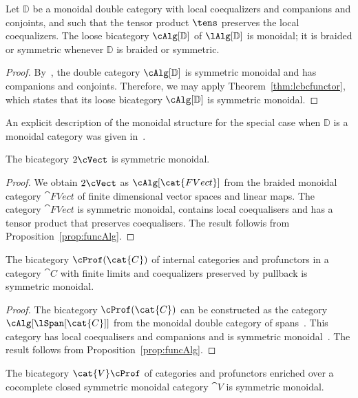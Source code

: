 \begin{prop}\label{thm:eqcomp}
Let $\mathbb{D}$ be a monoidal double category with local coequalizers and companions and conjoints, and such that the tensor product $\tens$ preserves the local coequalizers. The loose bicategory $\cAlg[\mathbb{D}]$ of $\lAlg[\mathbb{D}]$ is monoidal; it is braided or symmetric whenever $\mathbb{D}$ is braided or symmetric.
\end{prop}

\begin{proof}
By~\cite[Examples 9.2]{shulman:frbi}, the double category $\cAlg[\mathbb{D}]$ is symmetric monoidal and has companions and conjoints. Therefore, we may apply Theorem~\ref{thm:lcbcfunctor}, which states that its loose bicategory $\cAlg[\mathbb{D}]$ is symmetric monoidal.
\end{proof}


An explicit description of the monoidal structure for the special case when ${\mathbb{D}}$ is a monoidal category was given in~\cite{westerPhDthesis}. 

\begin{cor}
The bicategory $2\cVect$ is symmetric monoidal.
\end{cor}

\begin{proof}
We obtain $2\cVect$ as $\cAlg[\cat{FVect}]$ from the braided monoidal category $\cat{FVect}$ of finite dimensional vector spaces and linear maps. The category $\cat{FVect}$ is symmetric monoidal, contains local coequalisers and has a tensor product that preserves coequalisers. The result followis from Proposition~\ref{prop:funcAlg}.
\end{proof}

\begin{cor}
The bicategory $\cProf(\cat{C})$ of internal categories and profunctors in a category $\cat{C}$ with finite limits and coequalizers preserved by pullback is symmetric monoidal.
\end{cor}

\begin{proof}
The bicategory $\cProf(\cat{C})$ can be constructed as the category $\cAlg[\lSpan[\cat{C}]]$ from the monoidal double category of spans~\cite[Examples 4.2]{shulman:frbi}.
This category has local coequalisers and companions and is symmetric monoidal~\cite[Examples 4.15, 9.2]{shulman:frbi}. The result follows from Proposition~\ref{prop:funcAlg}.
\end{proof}

\begin{cor}
The bicategory $\cat{V}\cProf$ of categories and profunctors enriched over a cocomplete closed symmetric monoidal category $\cat{V}$ is symmetric monoidal.
\end{cor}

